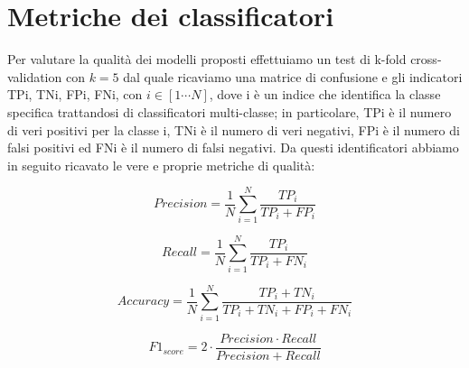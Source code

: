 \section{Metriche dei classificatori}
\label{sec:metrics}

Per valutare la qualità dei modelli proposti effettuiamo un test di k-fold cross-validation con $k=5$ dal quale ricaviamo una matrice di confusione e gli indicatori TPi, TNi, FPi, FNi, con $i \in [1\cdots N]$, dove i è un indice che identifica la classe specifica trattandosi di classificatori multi-classe; in particolare, TPi è il numero di veri positivi per la classe i, TNi è il numero di veri negativi, FPi è il numero di falsi positivi ed FNi è il numero di falsi negativi. Da questi identificatori abbiamo in seguito ricavato le vere e proprie metriche di qualità: 

\begin{equation}
    Precision = \dfrac{1}{N} \sum_{i=1}^{N} \dfrac{TP_i}{TP_i + FP_i}
    \label{eq:precision}
\end{equation}

\begin{equation}
    Recall = \dfrac{1}{N} \sum_{i=1}^{N} \dfrac{TP_i}{TP_i + FN_i}
    \label{eq:recall}
\end{equation}

\begin{equation}
    Accuracy = \dfrac{1}{N} \sum_{i=1}^{N} \dfrac{TP_i + TN_i}{TP_i + TN_i + FP_i + FN_i}    
    \label{eq:accuracy}
\end{equation}

\begin{equation}
    F1_{score} = 2 \cdot \dfrac{Precision \cdot Recall}{Precision + Recall}
    \label{eq:f1}
\end{equation}